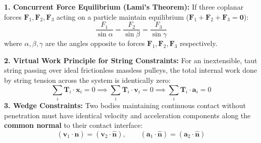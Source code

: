 \documentclass[10pt,a4paper]{article}
\begin{document}
\begin{formulabox}
\textbf{1. Concurrent Force Equilibrium (Lami's Theorem):} If three coplanar forces $\mathbf{F}_1, \mathbf{F}_2, \mathbf{F}_3$ acting on a particle maintain equilibrium ($\mathbf{F}_1 + \mathbf{F}_2 + \mathbf{F}_3 = \mathbf{0}$):
\begin{equation}
  \frac{F_1}{\sin\alpha} = \frac{F_2}{\sin\beta} = \frac{F_3}{\sin\gamma}
\end{equation}
where $\alpha, \beta, \gamma$ are the angles opposite to forces $\mathbf{F}_1, \mathbf{F}_2, \mathbf{F}_3$ respectively.

\textbf{2. Virtual Work Principle for String Constraints:} For an inextensible, taut string passing over ideal frictionless massless pulleys, the total internal work done by string tension across the system is identically zero:
\begin{equation}
  \sum_{i} \mathbf{T}_i \cdot \mathbf{x}_i = 0 \implies \sum_{i} \mathbf{T}_i \cdot \mathbf{v}_i = 0 \implies \sum_{i} \mathbf{T}_i \cdot \mathbf{a}_i = 0
\end{equation}
\textbf{3. Wedge Constraints:} Two bodies maintaining continuous contact without penetration must have identical velocity and acceleration components along the \textbf{common normal} to their contact interface:
\begin{equation}
  (\mathbf{v}_1 \cdot \hat{\mathbf{n}}) = (\mathbf{v}_2 \cdot \hat{\mathbf{n}}), \qquad (\mathbf{a}_1 \cdot \hat{\mathbf{n}}) = (\mathbf{a}_2 \cdot \hat{\mathbf{n}})
\end{equation}
\end{formulabox}
\end{document}
